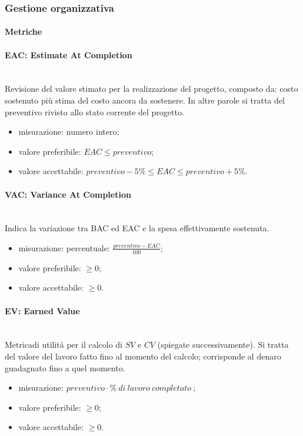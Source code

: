 	\subsubsection{Gestione organizzativa}
\paragraph{Metriche}			
\paragraph*{EAC: Estimate At Completion}\mbox{}\\
Revisione del valore stimato per la realizzazione del progetto, composto da: costo sostenuto più stima del costo ancora da sostenere. In altre parole si tratta del preventivo rivisto allo stato corrente del progetto.
\begin{itemize}
	\item  misurazione: numero intero;
	\item  valore preferibile: $ EAC \leq preventivo$;
	\item  valore accettabile: $ preventivo -5\% \leq EAC \leq preventivo + 5\%$. 
\end{itemize}

\paragraph*{VAC: Variance At Completion}\mbox{}\\
Indica la variazione tra BAC ed EAC e la spesa effettivamente sostenuta.
\begin{itemize}
	\item  misurazione: percentuale: $\frac{preventivo - EAC}{100}$;
	\item  valore preferibile: $\geq 0$;
	\item  valore accettabile: $\geq 0$.
\end{itemize}

\paragraph*{EV: Earned Value}\mbox{}\\
Metrica\glosp di utilità per il calcolo di $SV$ e $CV$ (spiegate successivamente). Si tratta del valore del lavoro fatto fino al momento del calcolo; corrisponde al denaro guadagnato fino a quel momento.
\begin{itemize}
	\item  misurazione: $preventivo \cdot \%\ di\ lavoro\ completato\ $;
	\item  valore preferibile: $ \geq 0$;
	\item  valore accettabile: $ \geq 0$.
\end{itemize}


